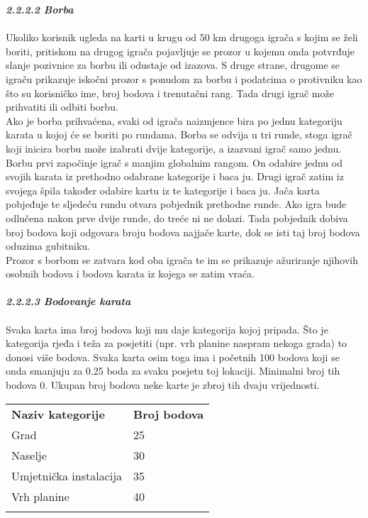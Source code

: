 		\textbf{\textit{\small2.2.2.2 Borba}}\\ \\
		{ Ukoliko korisnik ugleda na karti u krugu od 50 km drugoga igrača s kojim se želi boriti, pritiskom na drugog igrača pojavljuje se prozor u kojemu onda potvrđuje slanje pozivnice za borbu ili odustaje od izazova. S druge strane, drugome se  igraču prikazuje iskočni prozor s ponudom za borbu i podatcima o protivniku kao što su korisničko ime, broj bodova i trenutačni rang. Tada drugi igrač može prihvatiti ili odbiti borbu. \\ Ako je borba prihvaćena, svaki od igrača naizmjence bira po jednu kategoriju karata u kojoj će se boriti po rundama. Borba se odvija u tri runde, stoga igrač koji inicira borbu može izabrati dvije kategorije, a izazvani igrač samo jednu. Borbu prvi započinje igrač s manjim globalnim rangom. On odabire jednu od svojih karata iz prethodno odabrane kategorije i baca ju. Drugi igrač zatim iz svojega špila također odabire kartu iz te kategorije i baca ju. Jača karta pobjeđuje te sljedeću rundu otvara pobjednik prethodne runde. Ako igra bude odlučena nakon prve dvije runde, do treće ni ne dolazi. Tada pobjednik dobiva broj bodova koji odgovara broju bodova najjače karte, dok se isti taj broj bodova oduzima gubitniku.\\ Prozor s borbom se zatvara kod oba igrača te im se prikazuje ažuriranje njihovih osobnih bodova i bodova karata iz kojega se zatim vraća.} \\ \\
		
		
		\textbf{\textit{\small2.2.2.3 Bodovanje karata}}\\ \\
		{Svaka karta ima broj bodova koji mu daje kategorija kojoj pripada. Što je kategorija rjeđa i teža za posjetiti (npr. vrh planine naspram nekoga grada) to donosi više bodova. Svaka karta osim toga ima i početnih 100 bodova koji se onda smanjuju za 0.25 boda za svaku posjetu toj lokaciji. Minimalni broj tih bodova 0. Ukupan broj bodova neke karte je zbroj tih dvaju vrijednosti.\\ }
		
		
		\begin{tabular}{ll}
			\textbf{Naziv kategorije} & \textbf{Broj bodova} \\
			Grad                      & 25                   \\
			Naselje                   & 30                   \\
			Umjetnička instalacija    & 35                   \\
			Vrh planine               & 40                   \\
				&                     
		\end{tabular}
	
